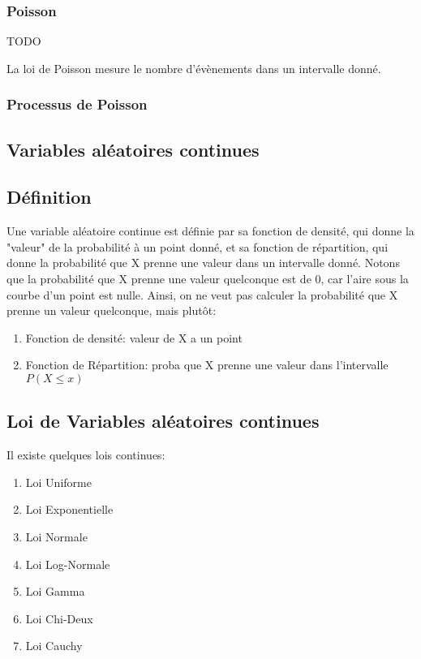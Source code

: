 \documentclass{article}
\begin{document}
\subsubsection{Poisson}%
\label{ssub:Poisson}

TODO

La loi de Poisson mesure le nombre d'évènements dans un intervalle donné.

\subsubsection{Processus de Poisson}%
\label{ssub:Processus de Poisson}


\subsection{Variables aléatoires continues}

\subsection{Définition}

Une variable aléatoire continue est définie par sa fonction de densité,
qui donne la "valeur" de la probabilité à un point donné, et sa fonction
de répartition, qui donne la probabilité que X prenne une valeur dans un
intervalle donné. Notons que la probabilité que X prenne une valeur
quelconque est de 0, car l'aire sous la courbe d'un point est nulle.
Ainsi, on ne veut pas calculer la probabilité que X prenne un valeur
quelconque, mais plutôt:

\begin{enumerate}
    \item Fonction de densité: valeur de X a un point
    \item Fonction de Répartition: proba que X prenne une valeur dans
	l'intervalle $ P(X \leq x)$
\end{enumerate}

\subsection{Loi de Variables aléatoires continues}

Il existe quelques lois continues:

\begin{enumerate}
    \item Loi Uniforme
    \item Loi Exponentielle
    \item Loi Normale
    \item Loi Log-Normale
    \item Loi Gamma
    \item Loi Chi-Deux
    \item Loi Cauchy
\end{enumerate}
\end{document}
